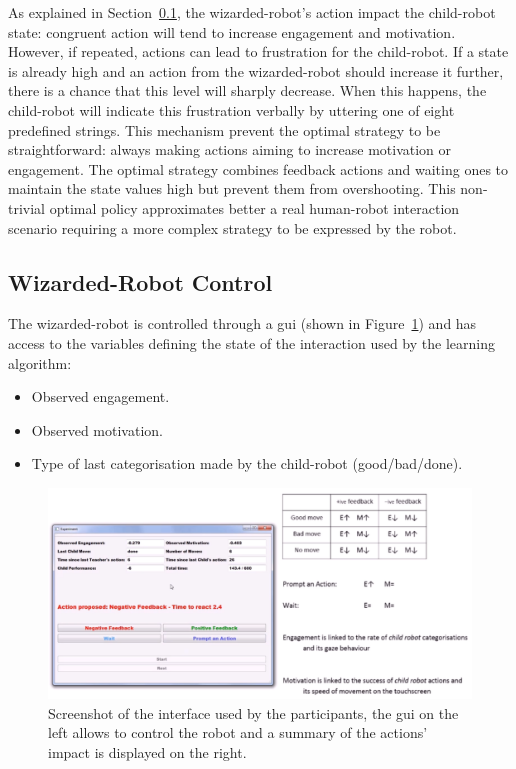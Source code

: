 As explained in Section~\ref{ssec:woz_wizarded_robot}, the wizarded-robot's action impact the child-robot state: congruent action will tend to increase engagement and motivation. However, if repeated, actions can lead to frustration for the child-robot. If a state is already high and an action from the wizarded-robot should increase it further, there is a chance that this level will sharply decrease. When this happens, the child-robot will indicate this frustration verbally by uttering one of eight predefined strings. This mechanism prevent the optimal strategy to be straightforward: always making actions aiming to increase motivation or engagement. The optimal strategy combines feedback actions and waiting ones to maintain the state values high but prevent them from overshooting. This non-trivial optimal policy approximates better a real human-robot interaction scenario requiring a more complex strategy to be expressed by the robot.

\subsection{Wizarded-Robot Control}
\label{ssec:woz_wizarded_robot}
The wizarded-robot is controlled through a \gls{gui} (shown in Figure~\ref{fig:woz_gui}) and has access to the variables defining the state of the interaction used by the learning algorithm:
\begin{itemize}
	\item Observed engagement.
	\item Observed motivation.
	\item Type of last categorisation made by the child-robot (good/bad/done).
\end{itemize}

\begin{figure}[ht]
	\centering
	\includegraphics[width=1\textwidth]{GUI-woz.png}
	\caption{Screenshot of the interface used by the participants, the \gls{gui} on the left allows to control the robot and a summary of the actions' impact is displayed on the right.}
	\label{fig:woz_gui}
\end{figure}

